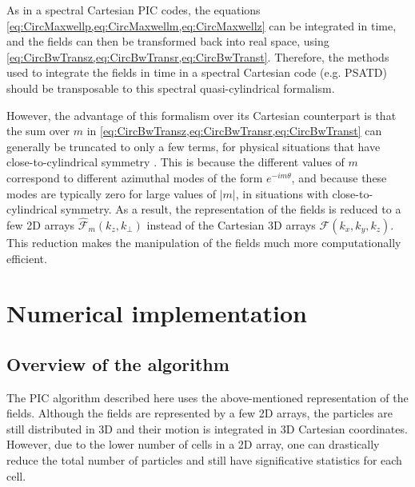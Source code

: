 \documentclass[1p,times,authoryear]{elsarticle}
\newcommand{\spectral}[1]{\hat{\mathcal{#1}}}
\begin{document}
As in a spectral Cartesian PIC codes, the equations
\cref{eq:CircMaxwellp,eq:CircMaxwellm,eq:CircMaxwellz}  
can be integrated in time, and the fields can then be transformed back into
real space, using \cref{eq:CircBwTransz,eq:CircBwTransr,eq:CircBwTranst}. Therefore,
the methods used to integrate the fields in time in a spectral Cartesian
code (e.g. PSATD) should be transposable to this spectral quasi-cylindrical formalism.

However, the advantage of this formalism over its Cartesian
counterpart is that the sum over $m$ in
\cref{eq:CircBwTransz,eq:CircBwTransr,eq:CircBwTranst} can generally
be truncated to only a few terms, for physical situations that have
close-to-cylindrical symmetry \citep{Lifschitz}. This is because the
different values of $m$ correspond to different azimuthal modes of the
form $e^{-im\theta}$, and because these modes are typically zero for
large values of $|m|$, in situations with close-to-cylindrical symmetry.
As a result, the representation of the fields is
reduced to a few 2D arrays $\spectral{F}_m(k_z,k_\perp )$ instead of the
Cartesian 3D arrays $\mathcal{F}(k_x,k_y,k_z)$. This reduction makes
the manipulation of the fields much more computationally efficient.

\section{Numerical implementation}
\label{sec:implementation}

\subsection{Overview of the algorithm}

The PIC algorithm described here uses the above-mentioned representation
of the fields. Although the fields are represented by a few
2D arrays, the particles are still distributed in 3D and their motion
is integrated in 3D Cartesian coordinates. However, due to the
lower number of cells in a 2D array, one can drastically reduce the
total number of particles and still have significative statistics for
each cell.
\end{document}
